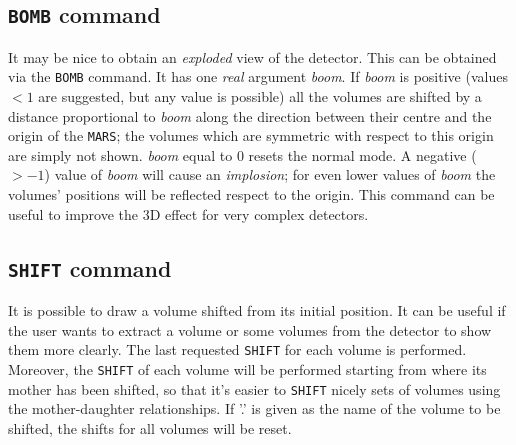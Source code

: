 \subsection{{\tt BOMB} command}
It may be nice to obtain an {\it exploded} view of the detector. This can
be obtained via the {\tt BOMB} command. It has one {\it real} argument
{\it boom}. If {\it boom} is positive (values $< 1$ are suggested, but any 
value is possible) all the volumes are shifted by a distance proportional 
to {\it boom} along the direction between their centre and the origin of 
the {\tt MARS}; the volumes which are symmetric with respect to this 
origin are simply not shown. {\it boom} equal to 0 resets the normal mode.
A negative ($ > -1$) value of {\it boom} will cause an {\it implosion}; 
for even lower values of {\it boom} the volumes' positions will be 
reflected respect to the origin. This command can be useful to improve 
the 3D effect for very complex detectors.

\subsection{{\tt SHIFT} command}
It is possible to draw a volume shifted from its initial position.
It can be useful if the user wants to extract a
volume or some volumes from the detector to show them more clearly.
The last requested {\tt SHIFT} for each volume
is performed. Moreover, the {\tt SHIFT} of
each volume will be performed starting from where its mother has
been shifted, so that it's easier to {\tt SHIFT} nicely sets
of volumes using the mother-daughter relationships.
If '.' is given as the name of the volume
to be shifted, the shifts for all volumes will be reset.
